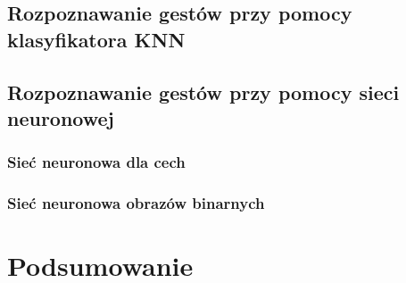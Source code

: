 \documentclass[a4paper,12pt,twoside,openany]{report}
\begin{document}
\section{Rozpoznawanie gestów przy pomocy klasyfikatora KNN}

\section{Rozpoznawanie gestów przy pomocy sieci neuronowej}
\subsection{Sieć neuronowa dla cech}
\subsection{Sieć neuronowa obrazów binarnych}
\chapter{Podsumowanie}





\appendix



\begin{thebibliography}{99}


\end{thebibliography}
\end{document}

